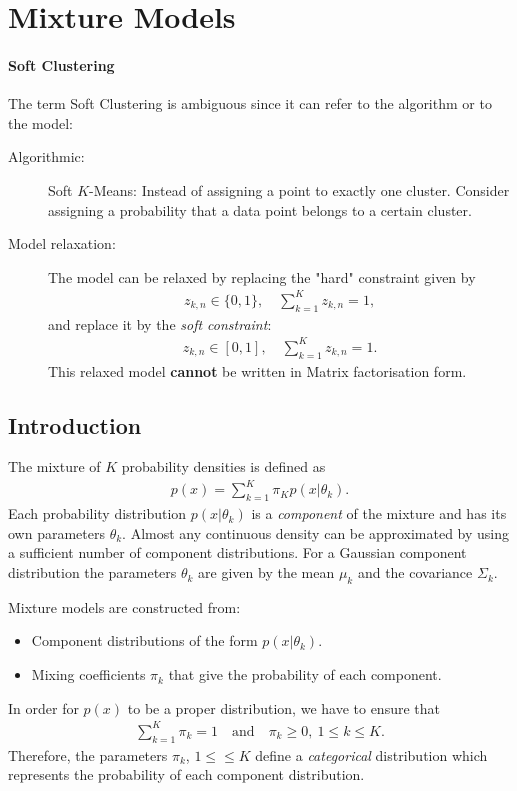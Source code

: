 \section{Mixture Models}
\paragraph{Soft Clustering}
The term Soft Clustering is ambiguous since it can refer to the algorithm or to the model:
\begin{description}
\item[Algorithmic:] Soft $K$-Means: Instead of assigning a point to exactly one cluster. Consider assigning a probability that a data point belongs to a certain cluster. 
\item[Model relaxation:] The model can be relaxed by replacing the "hard" constraint given by 
    \begin{align*}
        z_{k,n}\in \{0,1\}, \quad \sum_{k=1}^K z_{k,n} =1,
    \end{align*}
    and replace it by the \emph{soft constraint}:
    \begin{align*}
        z_{k,n} \in [0,1], \quad \sum_{k=1}^K z_{k,n} =1.
    \end{align*}
    This relaxed model \textbf{cannot} be written in Matrix factorisation form.
\end{description}

\subsection{Introduction}
The mixture of $K$ probability densities is defined as
\begin{align*}
    p(x) = \sum_{k=1}^K \pi_K p(x|\theta_k).
\end{align*}
Each probability distribution $p(x|\theta_k)$ is a \emph{component} of the mixture and has its own parameters $\theta_k$. Almost any continuous density can be approximated by using a sufficient number of component distributions. For a Gaussian component distribution the parameters $\theta_k$ are given by the mean $\mu_k$ and the covariance $\Sigma_k$. 


Mixture models are constructed from:
\begin{itemize}
    \item Component distributions of the form $p(x|\theta_k)$.
    \item Mixing coefficients $\pi_k$ that give the probability of each component.
\end{itemize}
In order for $p(x)$ to be a proper distribution, we have to ensure that
\begin{align*}
    \sum_{k=1}^K \pi_k=1\quad \text{and} \quad \pi_k \geq 0,\ 1\leq k\leq K.
\end{align*}
Therefore, the parameters $\pi_k$, $1\leq \leq K$ define a \emph{categorical} distribution which represents the probability of each component distribution.

